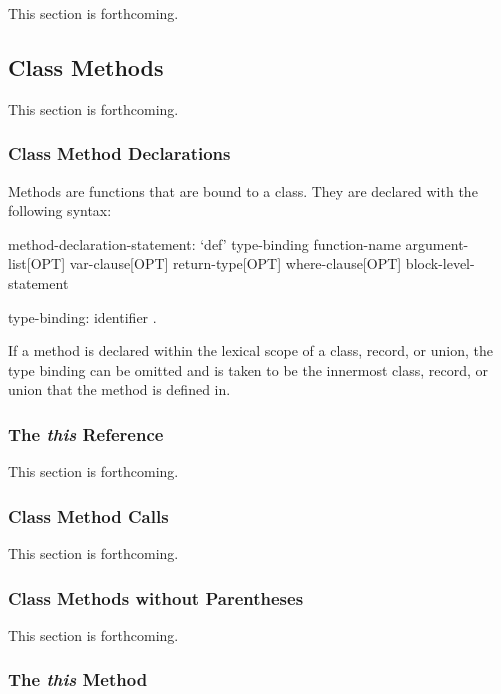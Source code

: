 This section is forthcoming.

\subsection{Class Methods}
\label{Class_Methods}

This section is forthcoming.

\subsubsection{Class Method Declarations}
\label{Class_Method_Declarations}

Methods are functions that are bound to a class.  They are declared
with the following syntax:
\begin{syntax}
method-declaration-statement:
  `def' type-binding function-name argument-list[OPT] var-clause[OPT]
    return-type[OPT] where-clause[OPT] block-level-statement

type-binding:
  identifier .
\end{syntax}

If a method is declared within the lexical scope of a class, record,
or union, the type binding can be omitted and is taken to be the
innermost class, record, or union that the method is defined in.

\subsubsection{The {\em this} Reference}
\label{The_em_this_Reference}

This section is forthcoming.

\subsubsection{Class Method Calls}
\label{Class_Method_Calls}

This section is forthcoming.

\subsubsection{Class Methods without Parentheses}
\label{Class_Methods_without_Parentheses}

This section is forthcoming.

\subsubsection{The {\em this} Method}
\label{The_em_this_Method}

